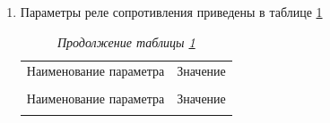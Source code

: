\begin{enumerate}[label=\arabic{section}.\arabic{subsection}.\arabic*,  align=left, labelsep=4pt, leftmargin=0pt, itemindent=57pt]
\item 
Параметры реле сопротивления приведены в таблице \ref{desc_dz:tbl1}

\small
\setlength{\extrarowheight}{0.05cm} %
\begin{longtable}
{|>{\centering\arraybackslash}m{15.2cm}|>{\centering\arraybackslash}m{1.7cm}|}
\caption{Параметры РС\hfill\vspace{-0.5\baselineskip}}\label{desc_dz:tbl1}\\ 
\hhline{|-|-|}
\rowcolor{gray!30}
Наименование параметра & Значение  \\ 
\hhline{|-|-|}
\endfirsthead

\caption*{\hspace{3pt}\emph{Продолжение таблицы \ref{desc_dz:tbl1}\hfill\vspace{-0.5\baselineskip}}} \\ %
\hhline{|-|-|}
\rowcolor{gray!30}
Наименование параметра & Значение  \\ 
\hhline{|-|-|}
\endhead
\hhline{|-|-|}

\endfoot
\endlastfoot


\end{longtable}
\end{enumerate}
